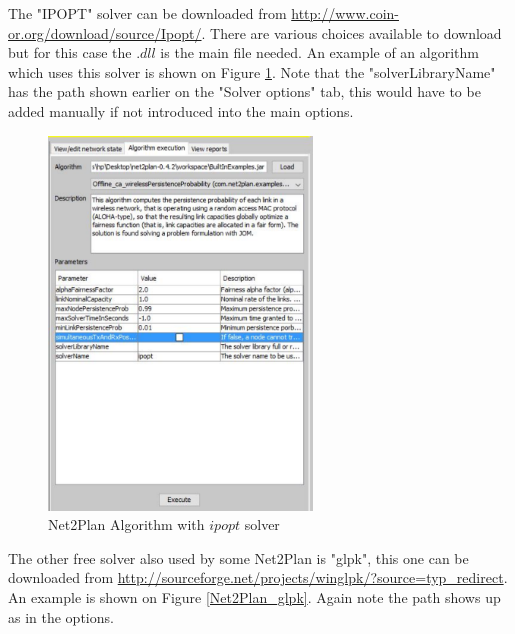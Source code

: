 	The "IPOPT" solver can be downloaded from \url{http://www.coin-or.org/download/source/Ipopt/}. There are various choices available to download but for this case the $.dll$ is the main file needed. An example of an algorithm which uses this solver is shown on Figure \ref{Net2Plan_ipopt}. Note that the "solverLibraryName" has the path shown earlier on the "Solver options" tab, this would have to be added manually if not introduced into the main options.
	
		
	\begin{figure}[h!]
		\centering
		\includegraphics[width = 7cm]{Net2Plan_ipopt.pdf}
		\caption{Net2Plan Algorithm with $ipopt$ solver}
		\label{Net2Plan_ipopt}
	\end{figure}
				
	\vspace{-0.2cm}
		
	The other free solver also used by some Net2Plan is "glpk", this one can be downloaded from \url{http://sourceforge.net/projects/winglpk/?source=typ_redirect}. An example is shown on Figure \ref{Net2Plan_glpk}. Again note the path shows up as in the options.
		

